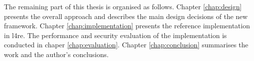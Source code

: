 The remaining part of this thesis is organised as follows.
Chapter \ref{chap:design} presents the overall approach and describes the main design decisions of the new framework.
Chapter \ref{chap:implementation} presents the reference implementation in \ac{l4re}.
The performance and security evaluation of the implementation is conducted in chaper \ref{chap:evaluation}.
Chapter \ref{chap:conclusion} summarises the work and the author's conclusions.
